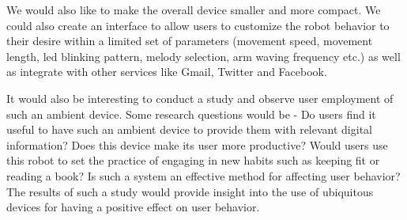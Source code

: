 \documentclass{sigchi-ext}
\begin{document}
We would also like to make the overall device smaller and more compact. We
could also create an interface to allow users to customize the robot behavior
to their desire within a limited set of parameters (movement speed, movement
length, led blinking pattern, melody selection, arm waving frequency etc.) as
well as integrate with other services like Gmail, Twitter and Facebook.

It would also be interesting to conduct a study and observe user employment of
such an ambient device. Some research questions would be - Do users find it
useful to have such an ambient device to provide them with relevant digital
information? Does this device make its user more productive? Would users use
this robot to set the practice of engaging in new habits such as keeping fit or
reading a book? Is such a system an effective method for affecting user
behavior? The results of such a study would provide insight into the use of
ubiquitous devices for having a positive effect on user behavior.


\end{document}
